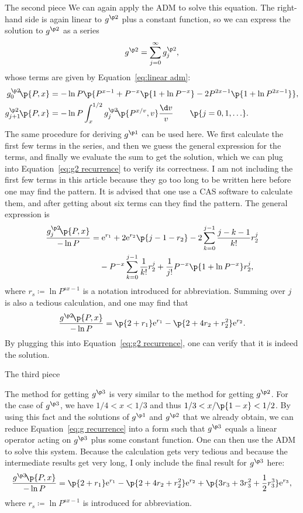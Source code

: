 \documentclass[oneside,12pt,final]{ucthesis-CA2012}
\newcommand{\mrm}[1]{\mathrm{#1}}
\newcommand{\ceq}{\coloneqq}
\newcommand{\e}{\mrm{e}}
\newcommand{\fr}{\frac}
\newcommand{\fc}[2]{#1\mathchoice{\!}{\!}{}{}\p{#2}} %
\begin{document}
\begin{mainmatter}
\begin{section}{The second piece}
We can again apply the ADM to solve this equation.
The right-hand side is again linear to $g^{\p2}$ plus a constant function,
so we can express the solution to $g^{\p2}$ as a series
\[g^{\p2}=\sum_{j=0}^\infty g^{\p2}_j,\]
whose terms are given by Equation~\ref{eq:linear adm}:
\begin{align*}
	\fc{g^{\p2}_0}{P,x}&=-\ln P\p{P^{x-1}+P^{-x}\p{1+\ln P^{-x}}-2P^{2x-1}\p{1+\ln P^{2x-1}}},\\
	\fc{g^{\p2}_{j+1}}{P,x}&=-\ln P\int_x^{1/2}\fc{g^{\p2}_j}{P^{x/v},v}\fr{\d v}v\qquad\p{j=0,1,\ldots}.
\end{align*}
The same procedure for deriving $g^{\p1}$ can be used here.
We first calculate the first few terms in the series,
and then we guess the general expression for the terms,
and finally we evaluate the sum to get the solution, which we can plug into Equation~\ref{eq:g2 recurrence}
to verify its correctness.
I am not including the first few terms in this article
because they go too long to be written here before one may find the pattern.
It is advised that one use a CAS software to calculate them,
and after getting about six terms can they find the pattern.
The general expression is
\begin{align*}
	\fr{\fc{g^{\p2}_j}{P,x}}{-\ln P}
	&=\e^{r_1}+2\e^{r_2}\p{j-1-r_2}-2\sum_{k=0}^{j-1}\fr{j-k-1}{k!}r_2^j\\
	&\phantom{={}}{}-P^{-x}\sum_{k=0}^{j-1}\fr1{k!}r_2^j+\fr1{j!}P^{-x}\p{1+\ln P^{-x}}r_2^j,
\end{align*}
where $r_s\ceq\ln P^{sx-1}$ is a notation introduced for abbreviation.
Summing over $j$ is also a tedious calculation, and one may find that
\begin{equation}
	\label{eq:g2 solution}
	\fr{\fc{g^{\p2}}{P,x}}{-\ln P}
	=\p{2+r_1}\e^{r_1}-\p{2+4r_2+r_2^2}\e^{r_2}.
\end{equation}
By plugging this into Equation~\ref{eq:g2 recurrence}, one can verify that it is indeed the solution.

\end{section}
\begin{section}{The third piece}
\label{sec:g3}

The method for getting $g^{\p3}$ is very similar to the method for getting $g^{\p2}$.
For the case of $g^{\p3}$, we have $1/4<x<1/3$ and thus $1/3<x/\p{1-x}<1/2$.
By using this fact and the solutions of $g^{\p1}$ and $g^{\p2}$ that we already obtain,
we can reduce Equation~\ref{eq:g recurrence} into a form such that $g^{\p3}$ equals
a linear operator acting on $g^{\p3}$ plus some constant function.
One can then use the ADM to solve this system.
Because the calculation gets very tedious and because the intermediate results get very long,
I only include the final result for $g^{\p3}$ here:
\begin{equation}
	\label{eq:g3 solution}
	\fr{\fc{g^{\p 3}}{P,x}}{-\ln P}
	=\p{2+r_1}\e^{r_1}-\p{2+4r_2+r_2^2}\e^{r_2}+\p{3r_3+3r_3^2+\fr12r_3^3}\e^{r_3},
\end{equation}
where $r_s\ceq\ln P^{sx-1}$ is introduced for abbreviation.


\end{section}
\end{mainmatter}
\end{document}
